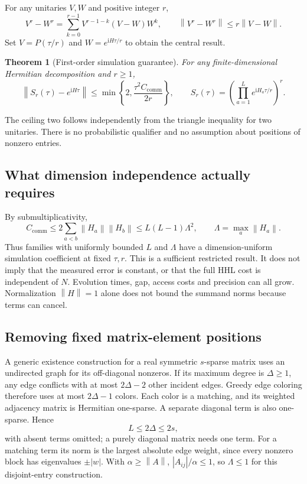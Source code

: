 \documentclass[11pt,a4paper]{article}
\newcommand{\norm}[1]{\left\lVert #1\right\rVert}
\newcommand{\C}{C_{\mathrm{comm}}}
\newcommand{\ip}{\mathrm{i}}
\newtheorem{theorem}{Theorem}[section]
\begin{document}
For any unitaries $V,W$ and positive integer $r$,
\begin{equation}
 V^r-W^r=\sum_{k=0}^{r-1}V^{r-1-k}(V-W)W^k,
 \qquad \norm{V^r-W^r}\leq r\norm{V-W}.
\end{equation}
Set $V=P(\tau/r)$ and $W=e^{\ip H\tau/r}$ to obtain the central result.

\begin{theorem}[First-order simulation guarantee]\label{thm:pf}
For any finite-dimensional Hermitian decomposition and $r\geq1$,
\begin{equation}\boxed{
 \norm{S_r(\tau)-e^{\ip H\tau}}\leq
 \min\left\{2,\frac{\tau^2\C}{2r}\right\},\qquad
 S_r(\tau)=\left(\prod_{a=1}^L e^{\ip H_a\tau/r}\right)^r.}
\end{equation}
\end{theorem}
The ceiling two follows independently from the triangle inequality for two unitaries. There is no probabilistic qualifier and no assumption about positions of nonzero entries.

\subsection{What dimension independence actually requires}
By submultiplicativity,
\begin{equation}\label{eq:envelope}
 \C\leq2\sum_{a<b}\norm{H_a}\norm{H_b}
 \leq L(L-1)\Lambda^2,\qquad \Lambda=\max_a\norm{H_a}.
\end{equation}
Thus families with uniformly bounded $L$ and $\Lambda$ have a dimension-uniform simulation coefficient at fixed $\tau,r$. This is a sufficient restricted result. It does not imply that the measured error is constant, or that the full HHL cost is independent of $N$. Evolution times, gap, access costs and precision can all grow. Normalization $\norm H=1$ alone does not bound the summand norms because terms can cancel.

\subsection{Removing fixed matrix-element positions}
A generic existence construction for a real symmetric $s$-sparse matrix uses an undirected graph for its off-diagonal nonzeros. If its maximum degree is $\Delta\geq1$, any edge conflicts with at most $2\Delta-2$ other incident edges. Greedy edge coloring therefore uses at most $2\Delta-1$ colors. Each color is a matching, and its weighted adjacency matrix is Hermitian one-sparse. A separate diagonal term is also one-sparse. Hence
\begin{equation}
 L\leq2\Delta\leq2s,
\end{equation}
with absent terms omitted; a purely diagonal matrix needs one term. For a matching term its norm is the largest absolute edge weight, since every nonzero block has eigenvalues $\pm|w|$. With $\alpha\geq\norm A$, $|A_{ij}|/\alpha\leq1$, so $\Lambda\leq1$ for this disjoint-entry construction.
\end{document}
